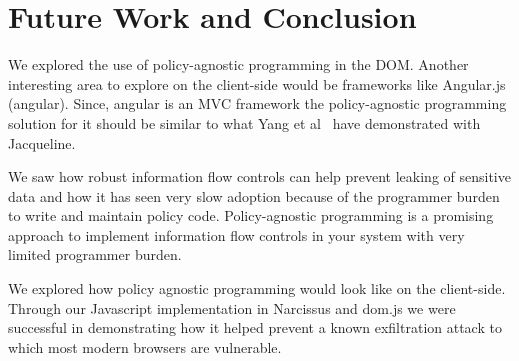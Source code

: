 \chapter{Future Work and Conclusion}
We explored the use of policy-agnostic programming in the DOM. Another interesting
area to explore on the client-side would be frameworks like Angular.js (angular).
Since, angular is an MVC framework the policy-agnostic programming solution for it
should be similar to what Yang et al~\cite{Jacqueline} have demonstrated with Jacqueline.

We saw how robust information flow controls can help prevent leaking of sensitive
data and how it has seen very slow adoption because of the programmer burden to
write and maintain policy code. Policy-agnostic programming is a promising approach
to implement information flow controls in your system with very limited programmer
burden.

We explored how policy agnostic programming would look like on the client-side.
Through our Javascript implementation in Narcissus and dom.js we were successful
in demonstrating how it helped prevent a known exfiltration attack to which most
modern browsers are vulnerable.

